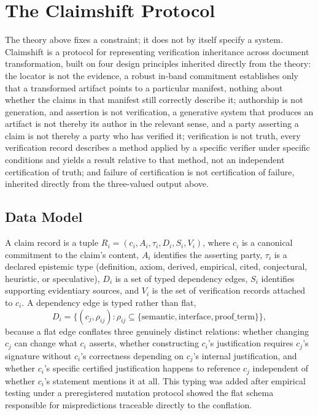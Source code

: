 \section{The Claimshift Protocol}

The theory above fixes a constraint; it does not by itself specify a system. Claimshift is a protocol for representing verification inheritance across document transformation, built on four design principles inherited directly from the theory: the locator is not the evidence, a robust in-band commitment establishes only that a transformed artifact points to a particular manifest, nothing about whether the claims in that manifest still correctly describe it; authorship is not generation, and assertion is not verification, a generative system that produces an artifact is not thereby its author in the relevant sense, and a party asserting a claim is not thereby a party who has verified it; verification is not truth, every verification record describes a method applied by a specific verifier under specific conditions and yields a result relative to that method, not an independent certification of truth; and failure of certification is not certification of failure, inherited directly from the three-valued output above.

\subsection{Data Model}

A claim record is a tuple $R_i = (c_i, A_i, \tau_i, D_i, S_i, V_i)$, where $c_i$ is a canonical commitment to the claim's content, $A_i$ identifies the asserting party, $\tau_i$ is a declared epistemic type (definition, axiom, derived, empirical, cited, conjectural, heuristic, or speculative), $D_i$ is a set of typed dependency edges, $S_i$ identifies supporting evidentiary sources, and $V_i$ is the set of verification records attached to $c_i$. A dependency edge is typed rather than flat,
\[
D_i = \{(c_j, \rho_{ij}) : \rho_{ij} \subseteq \{\mathrm{semantic}, \mathrm{interface}, \mathrm{proof\_term}\}\},
\]
because a flat edge conflates three genuinely distinct relations: whether changing $c_j$ can change what $c_i$ asserts, whether constructing $c_i$'s justification requires $c_j$'s signature without $c_i$'s correctness depending on $c_j$'s internal justification, and whether $c_i$'s specific certified justification happens to reference $c_j$ independent of whether $c_i$'s statement mentions it at all. This typing was added after empirical testing under a preregistered mutation protocol showed the flat schema responsible for mispredictions traceable directly to the conflation.

